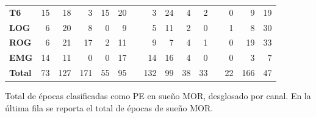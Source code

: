 \documentclass[12pt,a4paper]{mitthesis}
\begin{document}
\begin{SidewaysTable}
\begin{tabular}{lrrrrrcrrrrcrrr}
\rowcolor{gris}
\textbf{T6} &15&18&3 &15&20&&3 &24&4 &2 &&0 &9 &19 \\
\textbf{LOG}&6 &20&8 &0 &9 &&5 &11&2 &0 &&1 &8 &30 \\
\textbf{ROG}&6 &21&17&2 &11&&9 &7 &4 &1 &&0 &19&33 \\
\textbf{EMG}&14&11&0 &0 &17&&14&16&4 &0 &&0&3&7 \\
\rowcolor{gris2}
\textbf{Total}&73&127&171&55&95&&132&99&38&33&&22&166&47 \\
\bottomrule
\end{tabular}
\caption{Total de \'epocas clasificadas como PE en sue\~no MOR, desglosado por canal. En la 
\'ultima fila se reporta el total de \'epocas de sue\~no MOR.
}
\label{total_gpos_mor}
\end{SidewaysTable}

\end{document}
